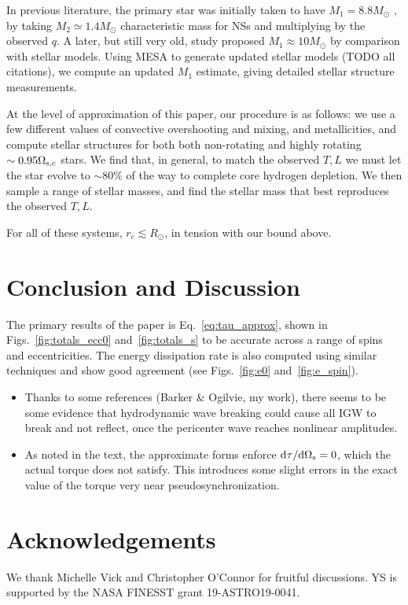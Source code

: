 \documentclass[
        fleqn,
        usenatbib,
    ]{mnras}
\newcommand*{\rdil}[2]{\mathrm{d}#1 / \mathrm{d}#2}
\begin{document}
In previous literature, the primary star was initially taken to have $M_1 =
8.8M_{\odot}$ \citep{kumar1998,lai1996}, by taking $M_2 \simeq 1.4M_{\odot}$
characteristic mass for NSs and multiplying by the observed $q$. A later, but
still very old, study proposed $M_1 \approx 10M_{\odot}$ by comparison with
stellar models. Using MESA to generate updated stellar models (TODO all
citations), we compute an updated $M_1$ estimate, giving detailed stellar
structure measurements.

At the level of approximation of this paper, our procedure is as follows: we
use a few different values of convective overshooting and mixing, and
metallicities, and compute stellar structures for both both non-rotating and
highly rotating $\sim 0.95\Omega_{\rm s, c}$ stars. We find that, in general, to
match the observed $T, L$ we must let the star evolve to $\sim 80\%$ of the way
to complete core hydrogen depletion. We then sample a range of stellar masses,
and find the stellar mass that best reproduces the observed $T, L$.

For all of these systems, $r_c \lesssim R_{\odot}$, in tension with our bound
above.

\section{Conclusion and Discussion}\label{s:disc}

The primary results of the paper is Eq.~\eqref{eq:tau_approx}, shown in
Figs.~\ref{fig:totals_ecc0} and~\ref{fig:totals_s} to be accurate across a range
of spins and eccentricities. The energy dissipation rate is also computed using
similar techniques and show good agreement (see Figs.~\ref{fig:e0}
and~\ref{fig:e_spin}).

\begin{itemize}
    \item Thanks to some references (Barker \& Ogilvie, my work), there seems to
        be some evidence that hydrodynamic wave breaking could cause all IGW to
        break and not reflect, once the pericenter wave reaches nonlinear
        amplitudes.

    \item As noted in the text, the approximate forms enforce
        $\rdil{\tau}{\Omega_{\rm s}} = 0$, which the actual torque does not satisfy.
        This introduces some slight errors in the exact value of the torque very
        near pseudosynchronization.
\end{itemize}

\section{Acknowledgements}

We thank Michelle Vick and Christopher O'Connor for fruitful discussions. YS is
supported by the NASA FINESST grant 19-ASTRO19-0041.%





\bsp
\label{lastpage} %
\end{document}
